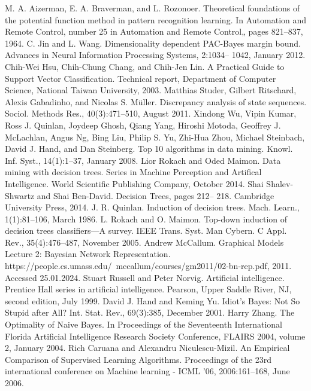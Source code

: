 \documentclass[preprint,12pt]{elsarticle}
\begin{document}
\begin{thebibliography}{000}
 M. A. Aizerman, E. A. Braverman, and L. Rozonoer. Theoretical foundations of the potential function method in pattern recognition learning. In Automation and Remote Control, number 25 in Automation and Remote Control„ pages 821–837, 1964. 
 C. Jin and L. Wang. Dimensionality dependent PAC-Bayes margin bound. Advances in Neural Information Processing Systems, 2:1034– 1042, January 2012. 
 Chih-Wei Hsu, Chih-Chung Chang, and Chih-Jen Lin. A Practical Guide to Support Vector Classification. Technical report, Department of Computer Science, National Taiwan University, 2003. 
 Matthias Studer, Gilbert Ritschard, Alexis Gabadinho, and Nicolas S. Müller. Discrepancy analysis of state sequences. Sociol. Methods Res., 40(3):471–510, August 2011. 
 Xindong Wu, Vipin Kumar, Ross J. Quinlan, Joydeep Ghosh, Qiang Yang, Hiroshi Motoda, Geoffrey J. McLachlan, Angus Ng, Bing Liu, Philip S. Yu, Zhi-Hua Zhou, Michael Steinbach, David J. Hand, and Dan Steinberg. Top 10 algorithms in data mining. Knowl. Inf. Syst., 14(1):1–37, January 2008. 
 Lior Rokach and Oded Maimon. Data mining with decision trees. Series in Machine Perception and Artifical Intelligence. World Scientific Publishing Company, October 2014. 
 Shai Shalev-Shwartz and Shai Ben-David. Decision Trees, pages 212– 218. Cambridge University Press, 2014. 
 J. R. Quinlan. Induction of decision trees. Mach. Learn., 1(1):81–106, March 1986. 
 L. Rokach and O. Maimon. Top-down induction of decision trees classifiers—A survey. IEEE Trans. Syst. Man Cybern. C Appl. Rev., 35(4):476–487, November 2005. 
 Andrew McCallum. Graphical Models Lecture 2: Bayesian Network Representation. https://people.cs.umass.edu/~mccallum/courses/gm2011/02-bn-rep.pdf, 2011. Accessed 25.01.2024. 
 Stuart Russell and Peter Norvig. Artificial intelligence. Prentice Hall series in artificial intelligence. Pearson, Upper Saddle River, NJ, second edition, July 1999. 
 David J. Hand and Keming Yu. Idiot’s Bayes: Not So Stupid after All? Int. Stat. Rev., 69(3):385, December 2001. 
 Harry Zhang. The Optimality of Naive Bayes. In Proceedings of the Seventeenth International Florida Artificial Intelligence Research Society Conference, FLAIRS 2004, volume 2, January 2004. 
 Rich Caruana and Alexandru Niculescu-Mizil. An Empirical Comparison of Supervised Learning Algorithms. Proceedings of the 23rd international conference on Machine learning - ICML ’06, 2006:161–168, June 2006. 

\end{thebibliography}
\end{document}

